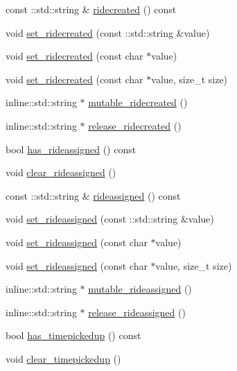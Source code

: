 \begin{DoxyCompactItemize}
\item 
const \-::std\-::string \& \hyperlink{classPatronInfo_aafa64a6f56fc1a68d26aaf67f84c3609}{ridecreated} () const 
\item 
void \hyperlink{classPatronInfo_a9bbdf2f1a5fa3fd0b48d2026f1e3e0af}{set\-\_\-ridecreated} (const \-::std\-::string \&value)
\item 
void \hyperlink{classPatronInfo_a48ec89142a775ccb2154289435160cff}{set\-\_\-ridecreated} (const char $\ast$value)
\item 
void \hyperlink{classPatronInfo_ab3361eed424905b881a4924405fbb96b}{set\-\_\-ridecreated} (const char $\ast$value, size\-\_\-t size)
\item 
inline\-::std\-::string $\ast$ \hyperlink{classPatronInfo_a2d39c781e65426de7f90791881dde482}{mutable\-\_\-ridecreated} ()
\item 
inline\-::std\-::string $\ast$ \hyperlink{classPatronInfo_aec831d673bcb3d517c38f3fe48adb127}{release\-\_\-ridecreated} ()
\item 
bool \hyperlink{classPatronInfo_a4c5c3117ff0fae6b0d875b61fd64eb8d}{has\-\_\-rideassigned} () const 
\item 
void \hyperlink{classPatronInfo_ab649d35ef4a57972f9e54a273e042602}{clear\-\_\-rideassigned} ()
\item 
const \-::std\-::string \& \hyperlink{classPatronInfo_adfedd814f7b45c5877448aff70ce777f}{rideassigned} () const 
\item 
void \hyperlink{classPatronInfo_acc3e8268f5886e78124a943761ed1b11}{set\-\_\-rideassigned} (const \-::std\-::string \&value)
\item 
void \hyperlink{classPatronInfo_add732df76c39a3d538bf92679096a1d7}{set\-\_\-rideassigned} (const char $\ast$value)
\item 
void \hyperlink{classPatronInfo_a816ca98fb8027e179e94b6d43d20893d}{set\-\_\-rideassigned} (const char $\ast$value, size\-\_\-t size)
\item 
inline\-::std\-::string $\ast$ \hyperlink{classPatronInfo_ac401b980c67334d619e7719a5dcd0161}{mutable\-\_\-rideassigned} ()
\item 
inline\-::std\-::string $\ast$ \hyperlink{classPatronInfo_a864c32f69ed92ed4ecec8ac7e0d33738}{release\-\_\-rideassigned} ()
\item 
bool \hyperlink{classPatronInfo_ab0a9df5078aaaef220e8c36d903ee867}{has\-\_\-timepickedup} () const 
\item 
void \hyperlink{classPatronInfo_a245332b9acbfb8164af4d5b37be55fab}{clear\-\_\-timepickedup} ()
\item 

\end{DoxyCompactItemize}
